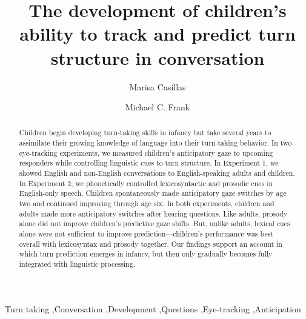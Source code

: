 \documentclass[authoryear, 12pt]{elsarticle}
\begin{document}
\begin{frontmatter}

\title{The development of children's ability to track and predict turn structure in conversation}

\author[MPI]{Marisa Casillas}
\address[MPI]{Max Planck Institute for Psycholinguistics, Nijmegen}

\author[StanfordPSY]{Michael C. Frank}

\address[StanfordPSY]{Department of Psychology, Stanford University}

\begin{abstract}
Children begin developing turn-taking skills in infancy but take several years to assimilate their growing knowledge of language into their turn-taking behavior. In two eye-tracking experiments, we measured children's anticipatory gaze to upcoming responders while controlling linguistic cues to turn structure. In Experiment 1, we showed English and non-English conversations to English-speaking adults and children. In Experiment 2, we phonetically controlled lexicosyntactic and prosodic cues in English-only speech. Children spontaneously made anticipatory gaze switches by age two and continued improving through age six. In both experiments, children and adults made more anticipatory switches after hearing questions. Like adults, prosody alone did not improve children's predictive gaze shifts. But, unlike adults, lexical cues alone were not sufficient to improve prediction---children's performance was best overall with lexicosyntax and prosody together. Our findings support an account in which turn prediction emerges in infancy, but then only gradually becomes fully integrated with linguistic processing. 
\end{abstract}

\begin{keyword}
Turn taking \sep Conversation \sep Development \sep Questions \sep Eye-tracking \sep Anticipation

\end{keyword}

\end{frontmatter}
\end{document}
